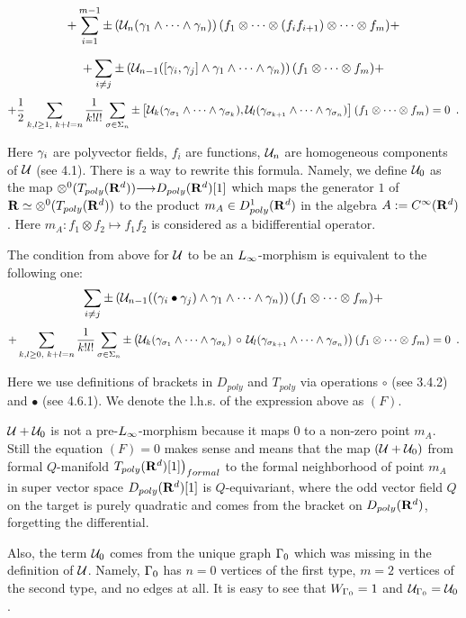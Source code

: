     $$+\sum_{i=1}^{m-1} \pm\left({\cal U}_n({\gamma}_1\wedge\dots\wedge {\gamma}_n)\right)
      (f_1\otimes\dots \otimes (f_i f_{i+1})\otimes\dots\otimes f_m)
      +$$
      
    $$+\sum_{i\ne j}\pm 
  \left({\cal U}_{n-1}([{\gamma}_i,{\gamma}_j]\wedge {\gamma}_1\wedge\dots\wedge {\gamma}_n)
  \right)(f_1\otimes\dots\otimes f_m)+$$
  $$+
 {1\over 2}
  \sum_{k,l\ge 1,\,\,k+l=n} {1\over k! l!}\sum_{\sigma\in \Sigma_n}
\pm \left[{\cal U}_k({\gamma}_{\sigma_1}\wedge\dots\wedge{\gamma}_{\sigma_k}),
{\cal U}_l({\gamma}_{\sigma_{k+1}}\wedge
\dots\wedge {\gamma}_{\sigma_n})\right](f_1\otimes \dots\otimes f_m)=0\,\,\,.$$
   
Here ${\gamma}_i$ are polyvector fields, $f_i$ are functions, ${\cal U}_n$ are
 homogeneous components of ${\cal U}$ (see 4.1).
 There is a way to rewrite this formula. Namely, we define
  ${\cal U}_0$ as the map 
  $\otimes ^0(
      T_{poly}({\bf R}^d)){\longrightarrow} D_{poly}({\bf R}^d)[1]$ which maps
      the generator $1$ of 
     ${\bf R}\simeq
     \otimes ^0(
      T_{poly}({\bf R}^d))$ to the product $m_A\in D^1_{poly}({\bf R}^d)$ in the algebra
      $A:=C^{\infty}({\bf R}^d)$. Here $m_A:f_1\otimes f_2\mapsto f_1 f_2$ is
      considered as a bidifferential operator.
      
      The condition from above
       for ${\cal U}$ to be an ${L_{\infty}}$-morphism is equivalent to the following one:
       $$\sum_{i\ne j}\pm 
  \left({\cal U}_{n-1}(({\gamma}_i\bullet {\gamma}_j)\wedge {\gamma}_1\wedge\dots\wedge {\gamma}_n)
  \right)(f_1\otimes\dots\otimes f_m)+$$
  $$+
  \sum_{k,l\ge 0,\,\,k+l=n} {1\over k! l!}\sum_{\sigma\in \Sigma_n}
\pm \left({\cal U}_k({\gamma}_{\sigma_1}\wedge\dots\wedge{\gamma}_{\sigma_k})\,
\circ \,{\cal U}_l({\gamma}_{\sigma_{k+1}}\wedge
\dots\wedge {\gamma}_{\sigma_n})\right)(f_1\otimes \dots\otimes f_m)=0\,\,\,.$$

Here we use definitions of brackets in $D_{poly}$ and $T_{poly}$ via
 operations $\circ$ (see  3.4.2) and $\bullet$ (see 4.6.1).
We denote the l.h.s. of the expression above as $(F)$. 

${\cal U}+{\cal U}_0$ is not a pre-${L_{\infty}}$-morphism because it maps $0$ to a non-zero point
 $m_A$. Still the equation $(F)=0$ makes  sense and means that the map
  $({\cal U}+{\cal U}_0)$ from formal $Q$-manifold
   $T_{poly}({\bf R}^d)[1]\bigr)_{formal}$ to the formal neighborhood
    of point $m_A$ in super 
    vector space $D_{poly}({\bf R}^d)[1]$ is $Q$-equivariant,
     where the odd vector field $Q$ on the target is purely quadratic and 
     comes
     from the bracket on $D_{poly}({\bf R}^d)$, forgetting the differential.
     
     Also, the term ${\cal U}_0$ comes from the unique graph ${\Gamma}_0$ which
      was missing in the definition of ${\cal U}$. Namely, 
      ${\Gamma}_0$ has $n=0$ vertices of the first type, $m=2$ vertices of the
      second type, and no edges at all. 
       It is easy to see that $W_{{\Gamma}_0}=1$ and ${\cal U}_{{\Gamma}_0}={\cal U}_0$.
      
